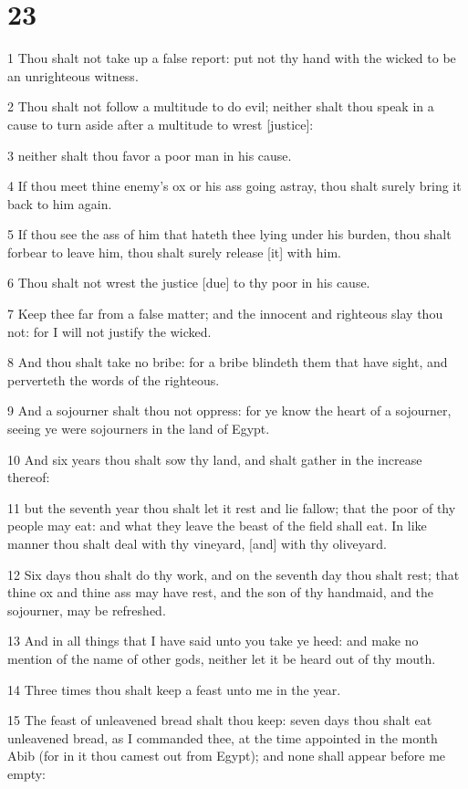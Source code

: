 \chapter{23}

\par 1 Thou shalt not take up a false report: put not thy hand with the wicked to be an unrighteous witness.
\par 2 Thou shalt not follow a multitude to do evil; neither shalt thou speak in a cause to turn aside after a multitude to wrest [justice]:
\par 3 neither shalt thou favor a poor man in his cause.
\par 4 If thou meet thine enemy's ox or his ass going astray, thou shalt surely bring it back to him again.
\par 5 If thou see the ass of him that hateth thee lying under his burden, thou shalt forbear to leave him, thou shalt surely release [it] with him.
\par 6 Thou shalt not wrest the justice [due] to thy poor in his cause.
\par 7 Keep thee far from a false matter; and the innocent and righteous slay thou not: for I will not justify the wicked.
\par 8 And thou shalt take no bribe: for a bribe blindeth them that have sight, and perverteth the words of the righteous.
\par 9 And a sojourner shalt thou not oppress: for ye know the heart of a sojourner, seeing ye were sojourners in the land of Egypt.
\par 10 And six years thou shalt sow thy land, and shalt gather in the increase thereof:
\par 11 but the seventh year thou shalt let it rest and lie fallow; that the poor of thy people may eat: and what they leave the beast of the field shall eat. In like manner thou shalt deal with thy vineyard, [and] with thy oliveyard.
\par 12 Six days thou shalt do thy work, and on the seventh day thou shalt rest; that thine ox and thine ass may have rest, and the son of thy handmaid, and the sojourner, may be refreshed.
\par 13 And in all things that I have said unto you take ye heed: and make no mention of the name of other gods, neither let it be heard out of thy mouth.
\par 14 Three times thou shalt keep a feast unto me in the year.
\par 15 The feast of unleavened bread shalt thou keep: seven days thou shalt eat unleavened bread, as I commanded thee, at the time appointed in the month Abib (for in it thou camest out from Egypt); and none shall appear before me empty:
